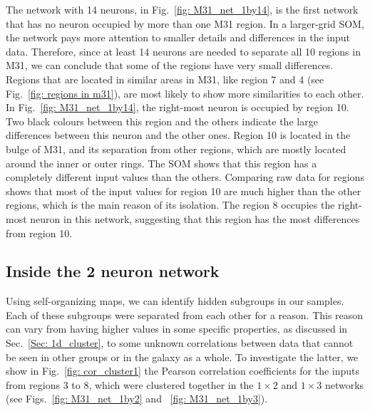         The network with 14 neurons, in Fig.~\ref{fig: M31_net_1by14}, is the first network that has no neuron occupied by more than one M31 region.
        In a larger-grid SOM, the network pays more attention to smaller details and differences in the input data.
        Therefore, since at least 14 neurons are needed to separate all 10 regions in M31, we can conclude that some of the regions have very small differences.
        Regions that are located in similar areas in M31, like region 7 and 4 (see Fig.~\ref{fig: regions in m31}), are most likely to show more similarities to each other.
        In Fig.~\ref{fig: M31_net_1by14}, the right-most neuron is occupied by region 10.
        Two black colours between this region and the others indicate the large differences between this neuron and the other ones.
       Region 10 is located in the bulge of M31, and its separation from other regions, which are mostly located around the inner or outer rings.
       The SOM shows that this region has a completely different input values than the others.
       Comparing raw data for regions shows that most of the input values for region 10 are much higher than the other regions, which is the main reason of its isolation.
        The region 8 occupies the right-most neuron in this network, suggesting that this region has the most differences from region 10.
        
        
    \subsection{Inside the 2 neuron network}%
        \label{sec: inside_the_2_neurons}
        Using self-organizing maps, we can identify hidden subgroups in our samples. 
        Each of these subgroups were separated from each other for a reason.
        This reason can vary from having higher values in some specific properties, as discussed in Sec.~\ref{Sec: 1d_cluster}, to some unknown correlations between data that cannot be seen in other groups or in the galaxy as a whole.
        To investigate the latter, we show in Fig.~\ref{fig: cor_cluster1} the Pearson correlation coefficients for the inputs from regions 3 to 8, which were clustered together in the $1\times2$ and $1\times3$ networks (see Figs.~\ref{fig: M31_net_1by2} and ~\ref{fig: M31_net_1by3}).
        
